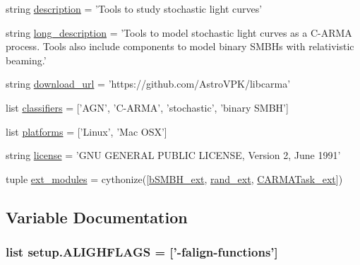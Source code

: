 \begin{DoxyCompactItemize}
\item 
string \hyperlink{namespacesetup_ade8aa54df2083113a10326ea2fe7934b}{description} = 'Tools to study stochastic light curves'
\item 
string \hyperlink{namespacesetup_a005c7e45ae91a23fbf155fca8b6a99d0}{long\-\_\-description} = 'Tools to model stochastic light curves as a C-\/A\-R\-M\-A process. Tools also include components to model binary S\-M\-B\-Hs with relativistic beaming.'
\item 
string \hyperlink{namespacesetup_ace7471dbb37081610d405f437793b251}{download\-\_\-url} = 'https\-://github.\-com/Astro\-V\-P\-K/libcarma'
\item 
list \hyperlink{namespacesetup_a2d96dddd66b7833bbb2db38dbbe55a02}{classifiers} = \mbox{[}'A\-G\-N', 'C-\/A\-R\-M\-A', 'stochastic', 'binary S\-M\-B\-H'\mbox{]}
\item 
list \hyperlink{namespacesetup_a5d7dbf5376a220cd300d93e9a0f48ea4}{platforms} = \mbox{[}'Linux', 'Mac O\-S\-X'\mbox{]}
\item 
string \hyperlink{namespacesetup_aae5aa7c9d1cf462778a54e8f6a874c6f}{license} = 'G\-N\-U G\-E\-N\-E\-R\-A\-L P\-U\-B\-L\-I\-C L\-I\-C\-E\-N\-S\-E, Version 2, June 1991'
\item 
tuple \hyperlink{namespacesetup_af330bcdd4c9a596a47b19a6b99efbd53}{ext\-\_\-modules} = cythonize(\mbox{[}\hyperlink{namespacesetup_a91a3cd768577c74b324ef9e0fdc8ae24}{b\-S\-M\-B\-H\-\_\-ext}, \hyperlink{namespacesetup_a72a912c8df91f65b2a80db002d55f4ff}{rand\-\_\-ext}, \hyperlink{namespacesetup_ab526aa988f441f3a58795affc1d3b7de}{C\-A\-R\-M\-A\-Task\-\_\-ext}\mbox{]})
\end{DoxyCompactItemize}


\subsection{Variable Documentation}
\hypertarget{namespacesetup_ad6de2d2793e8dad016a00e201563ff15}{
\subsubsection[{A\-L\-I\-G\-H\-F\-L\-A\-G\-S}]{\setlength{\rightskip}{0pt plus 5cm}list setup.\-A\-L\-I\-G\-H\-F\-L\-A\-G\-S = \mbox{[}'-\/falign-\/functions'\mbox{]}}}\label{namespacesetup_ad6de2d2793e8dad016a00e201563ff15}


